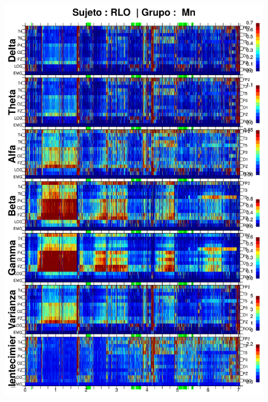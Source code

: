 \begin{figure}
\centering
\includegraphics[width=0.9\linewidth]
{./enlentecimiento/RLMN10SUE_espectral_total.png}
\end{figure}
